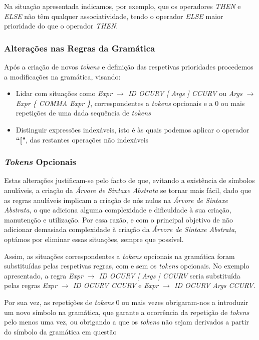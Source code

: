 \documentclass[11pt,a4paper]{article}
\begin{document}
Na situação apresentada indicamos, por exemplo, que os operadores \emph{THEN} e \emph{ELSE} não têm qualquer associatividade, tendo o operador \emph{ELSE} maior prioridade do que o operador \emph{THEN}.

\subsubsection{Alterações nas Regras da Gramática}

Após a criação de novos \emph{tokens} e definição das respetivas prioridades procedemos a modificações na gramática, visando:

\begin{itemize}
\item Lidar com situações como \emph{Expr $\rightarrow$ ID OCURV [ Args ] CCURV} ou \emph{Args $\rightarrow$ Expr \{ COMMA Expr \}}, correspondentes a \emph{tokens} opcionais e a 0 ou mais repetições de uma dada sequência de \emph{tokens}

\item Distinguir expressões indexáveis, isto é às quais podemos aplicar o operador \textbf{``["}, das restantes operações não indexáveis
\end{itemize}

\subsubsection{\emph{Tokens} Opcionais}

Estas alterações justificam-se pelo facto de que, evitando a existência de símbolos anuláveis, a criação da \emph{Árvore de Sintaxe Abstrata} se tornar mais fácil, dado que as regras anuláveis implicam a criação de nós nulos na \emph{Árvore de Sintaxe Abstrata}, o que adiciona alguma complexidade e dificuldade à sua criação, manutenção e utilização. Por essa razão, e com o principal objetivo de não adicionar demasiada complexidade à criação da \emph{Árvore de Sintaxe Abstrata}, optámos por eliminar essas situações, sempre que possível.

Assim, as situações correspondentes a \emph{tokens} opcionais na gramática foram substituídas pelas respetivas regras, com e sem os \emph{tokens} opcionais. No exemplo apresentado, a regra \emph{Expr $\rightarrow$ ID OCURV [ Args ] CCURV} seria substituída pelas regras \emph{Expr $\rightarrow$ ID OCURV CCURV} e \emph{Expr $\rightarrow$ ID OCURV Args CCURV}.

Por sua vez, as repetições de \emph{tokens} 0 ou mais vezes obrigaram-nos a introduzir um novo símbolo na gramática, que garante a ocorrência da repetição de \emph{tokens} pelo menos uma vez, ou obrigando a que os \emph{tokens} não sejam derivados a partir do símbolo da gramática em questão
\end{document}
